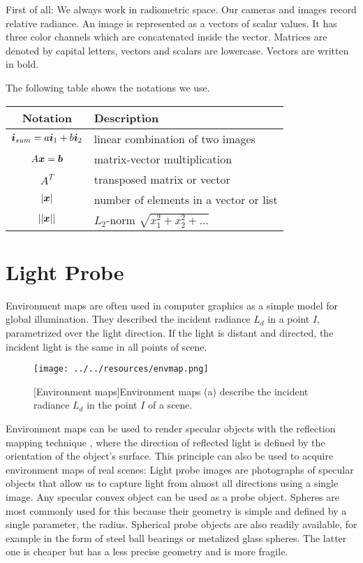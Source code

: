 First of all: We always work in radiometric space. Our cameras and images record relative radiance.
An image is represented as a vectors of scalar values. It has three color channels which are concatenated inside the vector. 
Matrices are denoted by capital letters, vectors and scalars are lowercase.
Vectors are written in bold.

The following table shows the notations we use.
    \begin{table}[H]
     \begin{tabular}{c|l}
        \toprule 
        Notation & Description\\
        \midrule
        $\boldsymbol{i}_{sum} = a\boldsymbol{i}_1 + b\boldsymbol{i}_2$  & linear combination of two images \\
        $A\boldsymbol{x}=\boldsymbol{b}$ & matrix-vector multiplication \\
        $A^T$ & transposed matrix or vector \\
        $|\boldsymbol{x}|$ & number of elements in a vector or list \\
        $||\boldsymbol{x}||$ & $L_2$-norm $\sqrt{x_1^2 + x_2^2 + ... }$ \\
        \bottomrule
     \end{tabular}
    \end{table}


\section{Light Probe}
\label{sec:lightprobe}

 Environment maps are often used in computer graphics as a simple model for global illumination.
 They described the incident radiance $L_d$ in a point $I$, parametrized over the light direction. 
 If the light is distant and directed, the incident light is the same in all points of scene.
 
 
  
 \begin{figure}[H]
    \centering\texttt{[image: ../../resources/envmap.png]}

  [Environment maps]{Environment maps (a) describe the incident radiance $L_d$ in the point $I$ of a scene.}
  \label{fig:envmapping}
 \end{figure}

 
 Environment maps can be used to render specular objects with the reflection mapping technique \cite{blinn1976texture}, 
 where the direction of reflected light is defined by the orientation of the object's surface.
 This principle can also be used to acquire environment maps of real scenes:
 Light probe images \cite{debevec1998rendering} are photographs of specular objects that allow us to capture light from almost all directions using a single image.
 Any specular convex object can be used as a probe object.
 Spheres are most commonly used for this because their geometry is simple and defined by a single parameter, the radius.
 Spherical probe objects are also readily available, for example in the form of steel ball bearings or metalized glass spheres. 
 The latter one is cheaper but has a less precise geometry and is more fragile.

